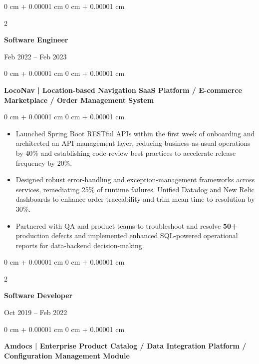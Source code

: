 \documentclass[10pt, letterpaper]{article}
\newenvironment{highlights}{
    \begin{itemize}[
        topsep=0.10 cm,
        parsep=0.10 cm,
        partopsep=0pt,
        itemsep=0pt,
        leftmargin=0 cm + 10pt
    ]
}{
    \end{itemize}
} %
\newenvironment{onecolentry}{
    \begin{adjustwidth}{
        0 cm + 0.00001 cm
    }{
        0 cm + 0.00001 cm
    }
}{
    \end{adjustwidth}
} %
\newenvironment{twocolentry}[2][]{
    \onecolentry
    \def\secondColumn{#2}
    \setcolumnwidth{\fill, 4.5 cm}
    \begin{paracol}{2}
}{
    \switchcolumn \raggedleft \secondColumn
    \end{paracol}
    \endonecolentry
} %
\begin{document}
        \vspace{0.1 cm}
        \begin{twocolentry}{Feb 2022 – Feb 2023}
            \textbf{Software Engineer}
            \end{twocolentry}
            \begin{onecolentry}
                \textbf{LocoNav | Location-based Navigation SaaS Platform / E-commerce Marketplace / Order Management System}
            \end{onecolentry}
        \vspace{0.10 cm}
        \begin{onecolentry}
            \begin{highlights}
                \item Launched Spring Boot RESTful APIs within the first week of onboarding and architected an API management layer, reducing business-as-usual operations by 40\% and establishing code-review best practices to accelerate release frequency by 20\%.
                
                
                \item Designed robust error-handling and exception-management frameworks across services, remediating 25\% of runtime failures. Unified Datadog and New Relic dashboards to enhance order traceability and trim mean time to resolution by 30\%.

                \item Partnered with QA and product teams to troubleshoot and resolve \textbf{50+} production defects and implemented enhanced SQL-powered operational reports for data-backend decision-making.
            \end{highlights}
        \end{onecolentry}


        \vspace{0.1 cm}
        \begin{twocolentry}{Oct 2019 – Feb 2022}
            \textbf{Software Developer}
        \end{twocolentry}
        \begin{onecolentry}
                \textbf{Amdocs | Enterprise Product Catalog / Data Integration Platform / Configuration Management Module}

        \end{onecolentry}
\end{document}

